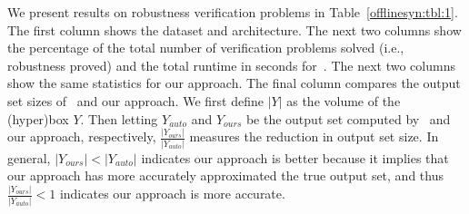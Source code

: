 We present results on robustness verification problems in
Table~\ref{offlinesyn:tbl:1}.
The first column shows the dataset and architecture. The next two columns show
the percentage of the total number of verification problems solved (i.e.,
robustness proved) and the total runtime in seconds for~\autolipra{}. The next
two columns show the same statistics for our approach. The final column
compares the
output set sizes of~\autolipra{} and our approach. We first define $ |Y| $ as
the volume of the (hyper)box $ Y $. Then letting $ Y_{auto} $ and $ Y_{ours} $
be the output set computed by~\autolipra{} and our approach, respectively, $
\frac{|Y_{ours}|}{|Y_{auto}|} $ measures the reduction in output set size. In
general, $ |Y_{ours} | < | Y_{auto} | $ indicates our approach is better
because it implies that our approach has more accurately approximated the true
output set, and thus $ \frac{|Y_{ours}|}{|Y_{auto}|} < 1 $ indicates our
approach is more accurate.


